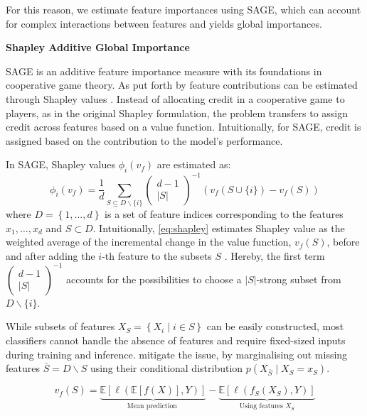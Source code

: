 For this reason, we estimate feature importances using \gls{SAGE}, which can account for complex interactions between features and yields global importances. 

\textbf{Shapley Additive Global Importance}

\gls{SAGE} is an additive feature importance measure with its foundations in cooperative game theory. As put forth by \textcite[][3]{lundbergUnifiedApproachInterpreting2017} feature contributions can be estimated through Shapley values \autocite[][11]{shapley17ValueNPerson1953}. Instead of allocating credit in a cooperative game to players, as in the original Shapley formulation, the problem transfers to assign credit across features based on a value function. Intuitionally, for \gls{SAGE}, credit is assigned based on the contribution to the model's performance.

In \gls{SAGE}, Shapley values $\phi_i(v_f)$ are estimated as:
\begin{equation}
    \phi_i(v_f)=\frac{1}{d} \sum_{S \subseteq D \backslash\{i\}}\left(\begin{array}{c}
        d-1 \\
        |S|
        \end{array}\right)^{-1}(v_f(S \cup\{i\})-v_f(S))
        \label{eq:shapley}
\end{equation}
where $D=\left\{1,\ldots,d\right\}$ is a set of feature indices corresponding to the features $x_1,\ldots,x_d$ and $S\subset D$. Intuitionally, \cref{eq:shapley} estimates Shapley value as the weighted average of the incremental change in the value function, $v_f(S)$, before and after adding the $i$-th feature to the subsets $S$ \autocite[][4--5]{covertUnderstandingGlobalFeature2020}. Hereby, the first term $\left(\begin{smallmatrix} d-1 \\|S|\end{smallmatrix}\right)^{-1}$ accounts for the possibilities to choose a $|S|$-strong subset from $D \backslash\{i\}$. 

While subsets of features $X_S = \left\{X_i \mid i \in S \right\}$ can be easily constructed, most classifiers cannot handle the absence of features and require fixed-sized inputs during training and inference. \textcite[][2]{covertUnderstandingGlobalFeature2020} mitigate the issue, by marginalising out missing features $\bar{S}=D\backslash S$ using their conditional distribution $p(X_{\bar{S}} \mid X_S=x_S)$.


\begin{equation}
    v_f(S)=\underbrace{\mathbb{E}\left[\ell\left(\mathbb{E}\left[f(X)\right], Y\right)\right]}_{\text {Mean prediction }}-\underbrace{\mathbb{E}\left[\ell\left(f_S\left(X_S\right), Y\right)\right]}_{\text {Using features } X_S}
\end{equation}    

